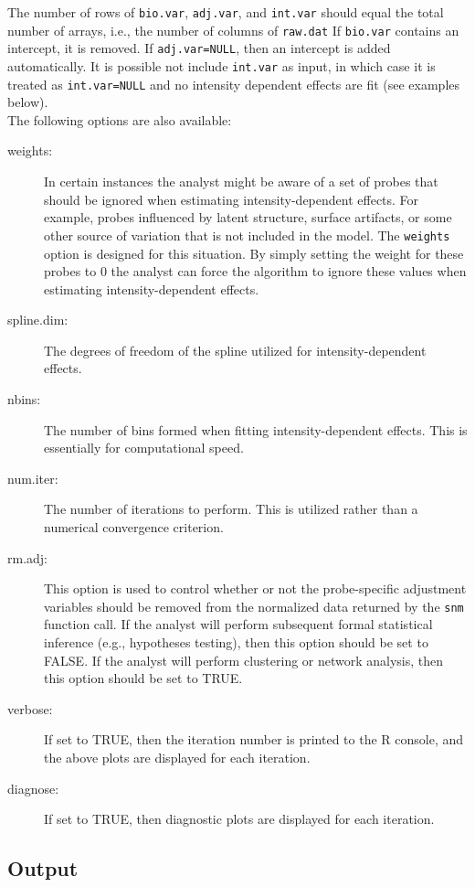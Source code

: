 \documentclass[11pt]{article}
\newcommand{\Rfunction}[1]{{\texttt{#1}}}
\begin{document}
The number of rows of {\tt bio.var}, {\tt adj.var}, and {\tt int.var} should equal the total number of arrays, i.e., the number of columns of {\tt  raw.dat}  If {\tt bio.var} contains an intercept, it is removed.  If {\tt adj.var=NULL}, then an intercept is added automatically.  It is possible not include {\tt int.var} as input, in which case it is treated as {\tt int.var=NULL} and no intensity dependent effects are fit (see examples below).  \\

The following options are also available:
\begin{description}
\item[weights:] In certain instances the analyst might be aware of a set of probes that should be ignored when  estimating intensity-dependent effects.  For example, probes influenced by  latent structure, surface artifacts, or some other source of variation that is not included in the model. The {\tt weights} option is designed for this situation.  By simply setting the weight for these probes to 0 the analyst can force the algorithm to ignore these values when estimating intensity-dependent effects. 
\item[spline.dim:] The degrees of freedom of the spline utilized for intensity-dependent effects.
\item[nbins:] The number of bins formed when fitting intensity-dependent effects.  This is essentially for computational speed.
\item[num.iter:] The number of iterations to perform.  This is utilized rather than a numerical convergence criterion. 
\item[rm.adj:] This option is used to control whether or not the probe-specific adjustment variables should be removed from the normalized data returned by the \Rfunction{snm} function call.  If the analyst will perform subsequent formal statistical inference (e.g., hypotheses testing), then  this option should be set to FALSE.  If the analyst will perform clustering or network analysis, then this option should be set to TRUE.
\item[verbose:] If set to TRUE, then the iteration number is printed to the R console, and the above plots are displayed for each iteration.
\item[diagnose:] If set to TRUE, then diagnostic plots are displayed for each iteration. 
\end{description}

\subsection{Output}
\end{document}
